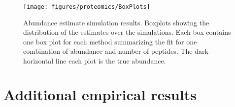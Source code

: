 
\begin{figure}
\centering
\texttt{[image: figures/proteomics/BoxPlots]}
\caption{Abundance estimate simulation results.
Boxplots showing the distribution of the estimates over the simulations.
Each box contains one box plot for each method summarizing the fit for one combination of abundance and number of peptides.
The dark horizontal line each plot is the true abundance.}
\end{figure}




\clearpage

\section{Additional empirical results}

